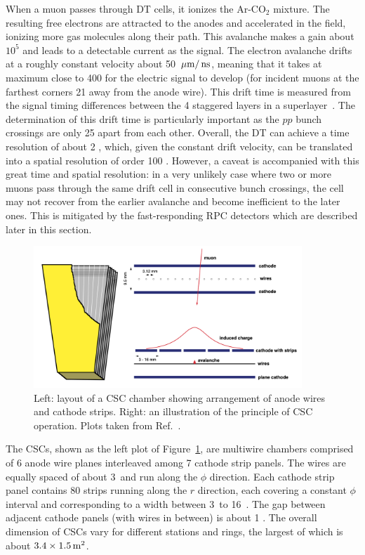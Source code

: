 When a muon passes through DT cells, it ionizes the $\text{Ar-CO}_{2}$ mixture. 
The resulting free electrons are attracted to the anodes and accelerated in the field, ionizing more gas molecules along their path.
This avalanche makes a gain about $10^5$ and leads to a detectable current as the signal.
The electron avalanche drifts at a roughly constant velocity about 50 $\mum/\ns$, 
meaning that it takes at maximum close to 400 \ns for the electric signal to develop 
(for incident muons at the farthest corners 21 \mm away from the anode wire).
This drift time is measured from the signal timing differences between the 4 staggered layers in a superlayer~\cite{ARCE2004441}.
The determination of this drift time is particularly important as the $pp$ bunch crossings are only 25 \ns apart from each other.
Overall, the DT can achieve a time resolution of about 2 \ns, which, given the constant drift velocity, 
can be translated into a spatial resolution of order 100 \mum.
However, a caveat is accompanied with this great time and spatial resolution: 
in a very unlikely case where two or more muons pass through the same drift cell in consecutive bunch crossings,
the cell may not recover from the earlier avalanche and become inefficient to the later ones.
This is mitigated by the fast-responding RPC detectors which are described later in this section.

\begin{figure}[!htb]
    \centering
    \captionsetup{justification=justified}
    \includegraphics[width=0.90\textwidth]{pics/LHC_CMS/CSC.png}
    \caption{Left: layout of a CSC chamber showing arrangement of anode wires and cathode strips.
             Right: an illustration of the principle of CSC operation.
             Plots taken from Ref.~\cite{collaboration_2013}.}
    \label{fig:cms_csc}
\end{figure}

The CSCs, shown as the left plot of Figure~\ref{fig:cms_csc}, are multiwire chambers comprised of 6 anode wire planes interleaved among 7 cathode strip panels.
The wires are equally spaced of about 3~\mm and run along the $\phi$ direction.  
Each cathode strip panel contains 80 strips running along the $r$ direction, each covering a constant $\phi$ interval and corresponding to a width between 3~\mm to 16~\mm. 
The gap between adjacent cathode panels (with wires in between) is about 1 \cm.  
The overall dimension of CSCs vary for different stations and rings, the largest of which is about $3.4 \times 1.5 \meter^{2}$.

